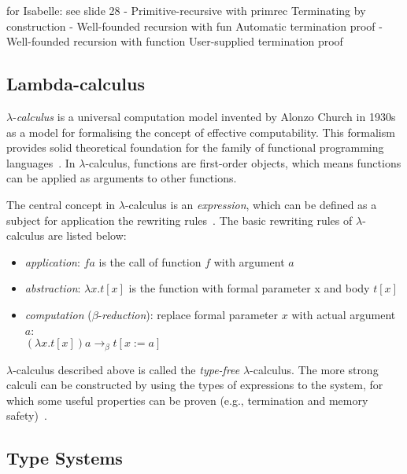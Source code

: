 \documentclass[article]{aaltoseries}
\begin{document}
for Isabelle: see slide 28 %
- Primitive-recursive with primrec
Terminating by construction
- Well-founded recursion with fun
Automatic termination proof
- Well-founded recursion with function
User-supplied termination proof


\subsection{Lambda-calculus}
\label{sec:lambda}

$\lambda$-\textit{calculus} is a universal computation model invented by Alonzo Church in 1930s as a model for formalising the concept of effective computability.  This formalism provides solid theoretical foundation for the family of functional programming languages~\cite{Roj15}. In $\lambda$-calculus, functions are first-order objects, which means functions can be applied as arguments to other functions.

The central concept in $\lambda$-calculus is an \textit{expression}, which can be defined as a subject for application the rewriting rules~\cite{Bar88}. The basic rewriting rules of $\lambda$-calculus are listed below:

\begin{itemize}
\itemsep0em
	\item \textit{application}:
	$f a$ is the call of function $f$ with argument $a$
	
	\item \textit{abstraction}:
	$\lambda x.t[x]$ is the function with formal parameter x and body $t[x]$
	
	\item \textit{computation} ($\beta$-\textit{reduction}): replace formal parameter $x$ with actual argument $a$: \\
	$(\lambda x.t[x]) a \rightarrow_{\beta} t[x:=a]$
\end{itemize}

$\lambda$-calculus described above is called the \textit{type-free} $\lambda$-calculus. The more strong calculi can be constructed by using the types of expressions to the system, for which some useful properties can be proven (e.g., termination and memory safety)~\cite{Bar13}.

\subsection{Type Systems}
\label{sec:type_systems}
\end{document}
